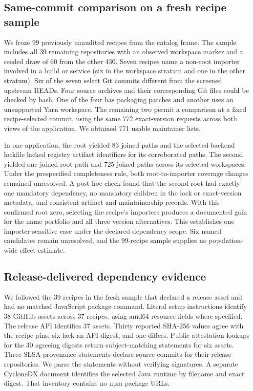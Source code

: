 \subsection{Same-commit comparison on a fresh recipe sample}
We froze 99 previously unaudited recipes from the catalog frame. The sample includes all 39 remaining repositories with an observed workspace marker and a seeded draw of 60 from the other 430. Seven recipes name a non-root importer involved in a build or service (six in the workspace stratum and one in the other stratum). Six of the seven select Git commits different from the screened upstream HEADs. Four source archives and their corresponding Git files could be checked by hash. One of the four has packaging patches and another uses an unsupported Yarn workspace. The remaining two permit a comparison at a fixed recipe-selected commit, using the same 772 exact-version requests across both views of the application. We obtained 771 usable maintainer lists.

In one application, the root yielded 83 joined paths and the selected backend lockfile lacked registry artifact identifiers for its corroborated paths. The second yielded one joined root path and 725 joined paths across its selected workspaces. Under the prespecified completeness rule, both root-to-importer coverage changes remained unresolved. A post hoc check found that the second root had exactly one mandatory dependency, no mandatory children in the lock or exact-version metadata, and consistent artifact and maintainership records. With this confirmed root zero, selecting the recipe's importers produces a documented gain for the name portfolio and all three version alternatives. This establishes one importer-sensitive case under the declared dependency scope. Six named candidates remain unresolved, and the 99-recipe sample supplies no population-wide effect estimate.

\subsection{Release-delivered dependency evidence}
We followed the 39 recipes in the fresh sample that declared a release asset and had no matched JavaScript package command. Literal setup instructions identify 38 GitHub assets across 37 recipes, using amd64 resource fields where specified. The release API identifies 37 assets. Thirty reported SHA-256 values agree with the recipe pins, six lack an API digest, and one differs. Public attestation lookups for the 30 agreeing digests return subject-matching statements for six assets. Three SLSA provenance statements declare source commits for their release repositories. We parse the statements without verifying signatures. A separate CycloneDX document identifies the selected Java runtime by filename and exact digest. That inventory contains no npm package URLs.

